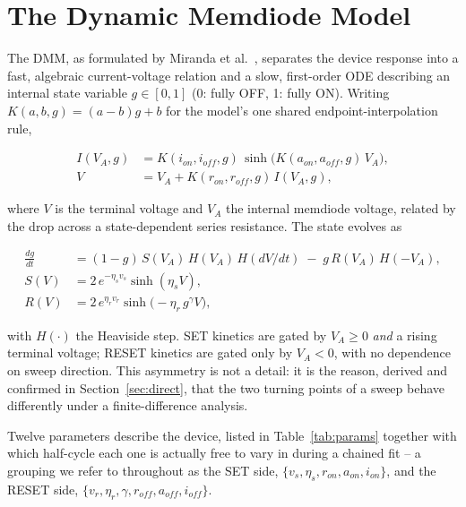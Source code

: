 \documentclass[11pt]{article}
\begin{document}
\section{The Dynamic Memdiode Model}
\label{sec:model}

The DMM, as formulated by Miranda et al.\ \cite{miranda2026hysteron},
separates the device response into a fast, algebraic current-voltage
relation and a slow, first-order ODE describing an internal state variable
$g \in [0,1]$ (0: fully OFF, 1: fully ON). Writing
$K(a,b,g) = (a-b)g + b$ for the model's one shared endpoint-interpolation
rule,

\begin{align}
I(V_A, g) &= K(i_{on}, i_{off}, g)\, \sinh\!\big(K(a_{on}, a_{off}, g)\, V_A\big), \\
V &= V_A + K(r_{on}, r_{off}, g)\, I(V_A, g),
\end{align}

where $V$ is the terminal voltage and $V_A$ the internal memdiode voltage,
related by the drop across a state-dependent series resistance. The state
evolves as

\begin{align}
\frac{dg}{dt} &= (1-g)\, S(V_A)\, H(V_A)\, H(dV/dt) \;-\; g\, R(V_A)\, H(-V_A), \\
S(V) &= 2\,e^{-\eta_s v_s}\sinh(\eta_s V), \\
R(V) &= 2\,e^{\eta_r v_r}\sinh\!\big(-\eta_r\, g^{\gamma} V\big),
\end{align}

with $H(\cdot)$ the Heaviside step. SET kinetics are gated by $V_A \ge 0$
\emph{and} a rising terminal voltage; RESET kinetics are gated only by
$V_A < 0$, with no dependence on sweep direction. This asymmetry is not a
detail: it is the reason, derived and confirmed in Section~\ref{sec:direct},
that the two turning points of a sweep behave differently under a
finite-difference analysis.

Twelve parameters describe the device, listed in Table~\ref{tab:params}
together with which half-cycle each one is actually free to vary in
during a chained fit -- a grouping we refer to throughout as the SET side,
$\{v_s,\eta_s,r_{on},a_{on},i_{on}\}$, and the RESET side,
$\{v_r,\eta_r,\gamma,r_{off},a_{off},i_{off}\}$.
\end{document}
